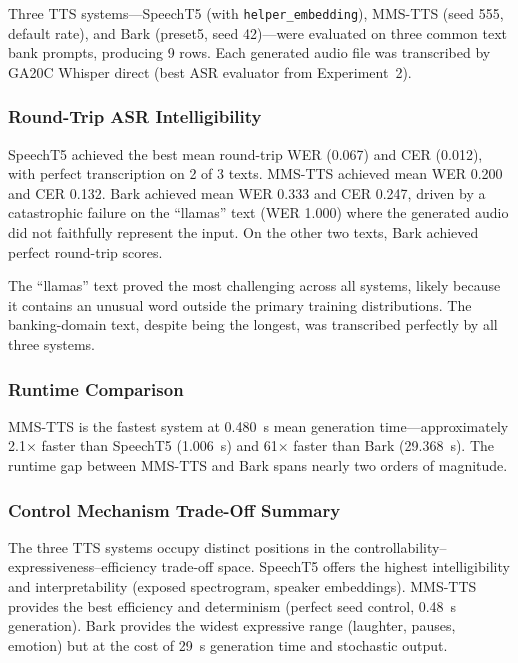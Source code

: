 \documentclass[conference]{IEEEtran}
\begin{document}
Three TTS systems---SpeechT5 (with \texttt{helper\_embedding}), MMS-TTS (seed 555, default rate), and Bark (preset5, seed 42)---were evaluated on three common text bank prompts, producing 9 rows. Each generated audio file was transcribed by GA20C Whisper direct (best ASR evaluator from Experiment~2).

\subsubsection{Round-Trip ASR Intelligibility}

SpeechT5 achieved the best mean round-trip WER (0.067) and CER (0.012), with perfect transcription on 2 of 3 texts. MMS-TTS achieved mean WER 0.200 and CER 0.132. Bark achieved mean WER 0.333 and CER 0.247, driven by a catastrophic failure on the ``llamas'' text (WER 1.000) where the generated audio did not faithfully represent the input. On the other two texts, Bark achieved perfect round-trip scores.

The ``llamas'' text proved the most challenging across all systems, likely because it contains an unusual word outside the primary training distributions. The banking-domain text, despite being the longest, was transcribed perfectly by all three systems.

\subsubsection{Runtime Comparison}

MMS-TTS is the fastest system at 0.480~s mean generation time---approximately 2.1$\times$ faster than SpeechT5 (1.006~s) and 61$\times$ faster than Bark (29.368~s). The runtime gap between MMS-TTS and Bark spans nearly two orders of magnitude.

\subsubsection{Control Mechanism Trade-Off Summary}

The three TTS systems occupy distinct positions in the controllability--expressiveness--efficiency trade-off space. SpeechT5 offers the highest intelligibility and interpretability (exposed spectrogram, speaker embeddings). MMS-TTS provides the best efficiency and determinism (perfect seed control, 0.48~s generation). Bark provides the widest expressive range (laughter, pauses, emotion) but at the cost of 29~s generation time and stochastic output.
\end{document}
